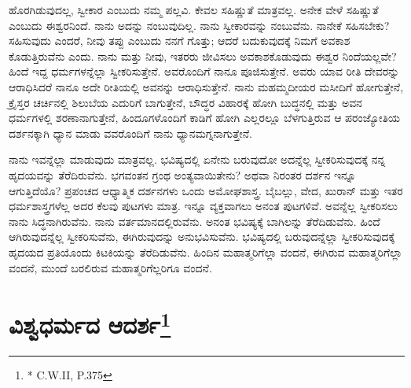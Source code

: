 
ಹೊರಗಿಡುವುದಲ್ಲ, ಸ್ವೀಕಾರ ಎಂಬುದು ನಮ್ಮ ಪಲ್ಲವಿ. ಕೇವಲ ಸಹಿಷ್ಣುತೆ ಮಾತ್ರವಲ್ಲ. ಅನೇಕ ವೇಳೆ ಸಹಿಷ್ಣುತೆ ಎಂಬುದು ಈಶ್ವರನಿಂದೆ. ನಾನು ಅದನ್ನು ನಂಬುವುದಿಲ್ಲ. ನಾನು ಸ್ವೀಕಾರವನ್ನು ನಂಬುವೆನು. ನಾನೇಕೆ ಸಹಿಸಬೇಕು? ಸಹಿಸುವುದು ಎಂದರೆ, ನೀವು ತಪ್ಪು ಎಂಬುದು ನನಗೆ ಗೊತ್ತು; ಆದರೆ ಬದುಕುವುದಕ್ಕೆ ನಿಮಗೆ ಅವಕಾಶ ಕೊಡುತ್ತಿರುವೆನು ಎಂದು. ನಾನು ಮತ್ತು ನೀವು, ಇತರರು ಜೀವಿಸಲು ಅವಕಾಶಕೊಡುವುದು ಈಶ್ವರ ನಿಂದೆಯಲ್ಲವೇ? ಹಿಂದೆ ಇದ್ದ ಧರ್ಮಗಳನ್ನೆಲ್ಲಾ ಸ್ವೀಕರಿಸುತ್ತೇನೆ. ಅವರೊಂದಿಗೆ ನಾನೂ ಪೂಜಿಸುತ್ತೇನೆ. ಅವರು ಯಾವ ರೀತಿ ದೇವರನ್ನು ಆರಾಧಿಸಿದರೆ ನಾನೂ ಅದೇ ರೀತಿಯಲ್ಲಿ ಅವನನ್ನು ಆರಾಧಿಸುತ್ತೇನೆ. ನಾನು ಮಹಮ್ಮದೀಯರ ಮಸೀದಿಗೆ ಹೋಗುತ್ತೇನೆ, ಕ್ರೈಸ್ತರ ಚರ್ಚಿನಲ್ಲಿ ಶಿಲುಬೆಯ ಎದುರಿಗೆ ಬಾಗುತ್ತೇನೆ, ಬೌದ್ಧರ ವಿಹಾರಕ್ಕೆ ಹೋಗಿ ಬುದ್ಧನಲ್ಲಿ ಮತ್ತು ಅವನ ಧರ್ಮಗಳಲ್ಲಿ ಶರಣಾನಾಗುತ್ತೇನೆ, ಹಿಂದೂಗಳೊಂದಿಗೆ ಕಾಡಿಗೆ ಹೋಗಿ ಎಲ್ಲರಲ್ಲೂ ಬೆಳಗುತ್ತಿರುವ ಆ ಪರಂಜ್ಯೋತಿಯ ದರ್ಶನಕ್ಕಾಗಿ ಧ್ಯಾನ ಮಾಡು ವವರೊಂದಿಗೆ ನಾನು ಧ್ಯಾನಮಗ್ನನಾಗುತ್ತೇನೆ.


ನಾನು ಇವನ್ನೆಲ್ಲಾ ಮಾಡುವುದು ಮಾತ್ರವಲ್ಲ. ಭವಿಷ್ಯದಲ್ಲಿ ಏನೇನು ಬರುವುದೋ ಅದನ್ನೆಲ್ಲ ಸ್ವೀಕರಿಸುವುದಕ್ಕೆ ನನ್ನ ಹೃದಯವನ್ನು ತೆರೆದಿರುವೆನು. ಭಗವಂತನ ಗ್ರಂಥ ಅಂತ್ಯವಾಯಿತೇನು? ಅಥವಾ ನಿರಂತರ ದರ್ಶನ ಇನ್ನೂ ಆಗುತ್ತಿದೆಯೊ? ಪ್ರಪಂಚದ ಆಧ್ಯಾತ್ಮಿಕ ದರ್ಶನಗಳು ಒಂದು ಅಮೋಘಶಾಸ್ತ್ರ. ಬೈಬಲ್ಲು, ವೇದ, ಖುರಾನ್​ ಮತ್ತು ಇತರ ಧರ್ಮಶಾಸ್ತ್ರಗಳೆಲ್ಲ ಅದರ ಕೆಲವು ಪುಟಗಳು ಮಾತ್ರ. ಇನ್ನೂ ವ್ಯಕ್ತವಾಗಲು ಅನಂತ ಪುಟಗಳಿವೆ. ಅವನ್ನೆಲ್ಲ ಸ್ವೀಕರಿಸಲು ನಾನು ಸಿದ್ಧನಾಗಿರುವೆನು. ನಾನು ವರ್ತಮಾನದಲ್ಲಿರುವೆನು. ಅನಂತ ಭವಿಷ್ಯಕ್ಕೆ ಬಾಗಿಲನ್ನು ತೆರೆದಿಡುವೆನು. ಹಿಂದೆ ಆಗಿರುವುದನ್ನೆಲ್ಲ ಸ್ವೀಕರಿಸುವೆನು, ಈಗಿರುವುದನ್ನು ಅನುಭವಿಸುವೆನು. ಭವಿಷ್ಯದಲ್ಲಿ ಬರುವುದನ್ನೆಲ್ಲಾ ಸ್ವೀಕರಿಸುವುದಕ್ಕೆ ಹೃದಯದ ಪ್ರತಿಯೊಂದು ಕಿಟಕಿಯನ್ನು ತೆರೆದಿಡುವೆನು. ಹಿಂದಿನ ಮಹಾತ್ಮರಿಗೆಲ್ಲಾ ವಂದನೆ, ಈಗಿರುವ ಮಹಾತ್ಮರಿಗೆಲ್ಲಾ ವಂದನೆ, ಮುಂದೆ ಬರಲಿರುವ ಮಹಾತ್ಮರಿಗೆಲ್ಲರಿಗೂ ವಂದನೆ.

\chapter{ವಿಶ್ವಧರ್ಮದ ಆದರ್ಶ\protect\footnote{* C.W.II, P.375}}

